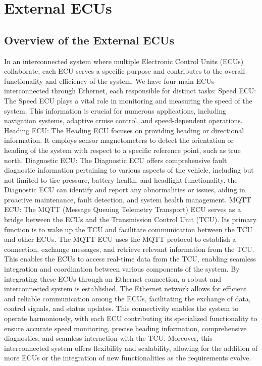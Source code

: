 \documentclass[
12pt,
oneside, 
onehalfspacing, 
nolistspacing, 
parskip, 
chapterinoneline, 
]{AASTCOMPUTER}
\begin{document}
\chapter{External ECUs}
\section{Overview of the External ECUs}
In an interconnected system where multiple Electronic Control Units (ECUs) collaborate, each ECU serves a specific purpose and contributes to the overall functionality and efficiency of the system. We have four main ECUs interconnected through Ethernet, each responsible for distinct tasks:
Speed ECU: The Speed ECU plays a vital role in monitoring and measuring the speed of the system. This information is crucial for numerous applications, including navigation systems, adaptive cruise control, and speed-dependent operations.
Heading ECU: The Heading ECU focuses on providing heading or directional information. It employs sensor magnetometers to detect the orientation or heading of the system with respect to a specific reference point, such as true north.
Diagnostic ECU: The Diagnostic ECU offers comprehensive fault diagnostic information pertaining to various aspects of the vehicle, including but not limited to tire pressure, battery health, and headlight functionality. the Diagnostic ECU can identify and report any abnormalities or issues, aiding in proactive maintenance, fault detection, and system health management.
MQTT ECU: The MQTT (Message Queuing Telemetry Transport) ECU serves as a bridge between the ECUs and the Transmission Control Unit (TCU). Its primary function is to wake up the TCU and facilitate communication between the TCU and other ECUs. The MQTT ECU uses the MQTT protocol to establish a connection, exchange messages, and retrieve relevant information from the TCU. This enables the ECUs to access real-time data from the TCU, enabling seamless integration and coordination between various components of the system.
By integrating these ECUs through an Ethernet connection, a robust and interconnected system is established. The Ethernet network allows for efficient and reliable communication among the ECUs, facilitating the exchange of data, control signals, and status updates. This connectivity enables the system to operate harmoniously, with each ECU contributing its specialized functionality to ensure accurate speed monitoring, precise heading information, comprehensive diagnostics, and seamless interaction with the TCU.
Moreover, this interconnected system offers flexibility and scalability, allowing for the addition of more ECUs or the integration of new functionalities as the requirements evolve. 
\end{document}
